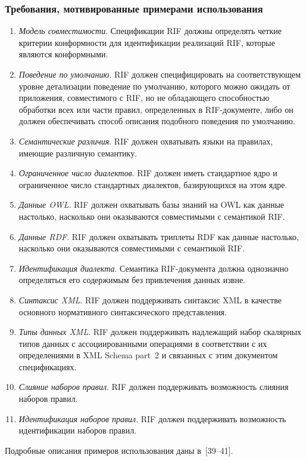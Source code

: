 \begin{multicols}{2}
   \subsubsection{Требования, мотивированные примерами использования} %

\noindent
\begin{enumerate}[1.]
\item \textit{Модель совместимости}. Спецификации RIF должны определять четкие критерии 
конформности для идентификации реализаций RIF, которые являются конформными.
\item \textit{Поведение по умолчанию}. RIF должен специфицировать на соответствующем уровне 
детализации поведение по умолчанию, которого можно ожидать от приложения, совместимого с RIF, но не 
обладающего способностью обработки всех или части правил, определенных в RIF-до\-ку\-мен\-те, либо он 
должен обеспечивать способ описания подобного поведения по умолчанию.
\item \textit{Семантические различия}. RIF должен охватывать языки на правилах, имеющие различную 
семантику.
\item \textit{Ограниченное число диалектов}. RIF должен иметь стандартное ядро и ограниченное число 
стандартных диалектов, базирующихся на этом ядре.
\item \textit{Данные OWL}. RIF должен охватывать базы знаний на OWL как данные настолько, насколько 
они оказываются совместимыми с семантикой RIF.
\item \textit{Данные RDF}. RIF должен охватывать триплеты RDF как данные настолько, насколько они 
оказываются совместимыми с семантикой RIF.
\item \textit{Идентификация диалекта}. Семантика RIF-документа должна однозначно определяться его 
содержимым без привлечения данных извне.
\item \textit{Синтаксис XML}. RIF должен поддерживать синтаксис XML в качестве основного нормативного 
синтаксического представления.
\item \textit{Типы данных XML}. RIF должен поддерживать надлежащий набор скалярных типов данных с 
ассоциированными операциями в соответствии с их определениями в XML Schema part~2 и связанных с 
этим документом спецификациях.
\item \textit{Слияние наборов правил}. RIF должен поддерживать возможность слияния наборов правил.
\item \textit{Идентификация наборов правил}. RIF должен поддерживать возможность идентификации 
наборов правил. 
\end{enumerate}
Подробные описания примеров использования даны в~[39--41].


\end{multicols}
